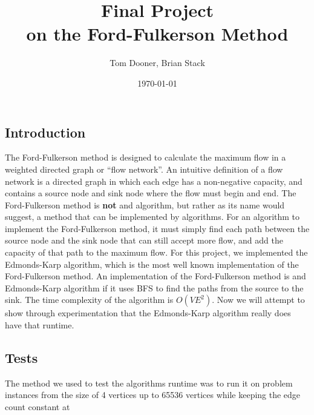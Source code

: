 \documentclass[letterpaper]{report}
\title{Final Project\\ \small{ on the Ford-Fulkerson Method}}
\author{Tom Dooner, Brian Stack}
\date{\today}
\begin{document}
\maketitle

\subsection*{Introduction}

The Ford-Fulkerson method is designed to calculate the maximum flow in a weighted directed graph or ``flow network''.  An intuitive definition of a flow network is a directed graph in which each edge has a non-negative capacity, and contains a source node and sink node where the flow must begin and end.  The Ford-Fulkerson method is \textbf{not} and algorithm, but rather as its name would suggest, a method that can be implemented by algorithms.  For an algorithm to implement the Ford-Fulkerson method, it must simply find each path between the source node and the sink node that can still accept more flow, and add the capacity of that path to the maximum flow.  For this project, we implemented the Edmonds-Karp algorithm, which is the most well known implementation of the Ford-Fulkerson method.  An implementation of the Ford-Fulkerson method is and Edmonds-Karp algorithm if it uses BFS to find the paths from the source to the sink. The time complexity of the algorithm is $O(VE^2)$.  Now we will attempt to show through experimentation that the Edmonds-Karp algorithm really does have that runtime.

\subsection*{Tests}

The method we used to test the algorithms runtime was to run it on problem instances from the size of 4 vertices up to 65536 vertices while keeping the edge count constant at 
\end{document}
